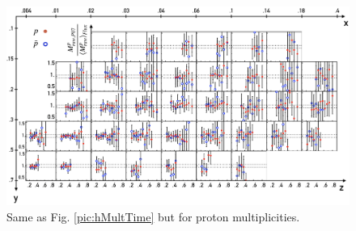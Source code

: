 \begin{figure}
  \centering
	\includegraphics[scale=0.7]{./gfx/SysTimeMultp.png}
	\caption{Same as Fig. \ref{pic:hMultTime} but for proton multiplicities.}
	\label{pic:pMultTime}
\end{figure}
